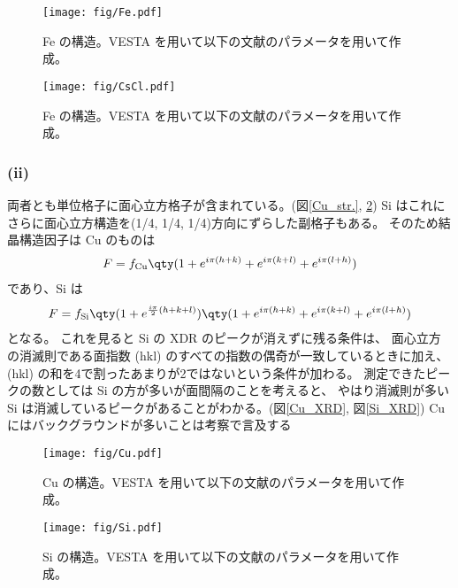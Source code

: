 \documentclass[11pt,dvipdfmx,a4paper]{jsarticle}
\begin{document}
\begin{figure}[h]
	\centering
	\begin{minipage}[t]{0.48\columnwidth}
		\centering
		\texttt{[image: fig/Fe.pdf]}
		\caption{Fe の構造。VESTA を用いて以下の文献のパラメータを用いて作成。\cite{cfi_Fe}}
		\label{Fe_str.}
	\end{minipage}
	\hfill
	\begin{minipage}[t]{0.48\columnwidth}
		\centering
		\texttt{[image: fig/CsCl.pdf]}
		\caption{Fe の構造。VESTA を用いて以下の文献のパラメータを用いて作成。\cite{cfi_CsCl}}
		\label{CsCl_str.}
	\end{minipage}
\end{figure}

\subsubsection*{(ii)}
両者とも単位格子に面心立方格子が含まれている。(図\ref{Cu_str.}, \ref{Si_str.})
Si はこれにさらに面心立方構造を(1/4, 1/4, 1/4)方向にずらした副格子もある。%
そのため結晶構造因子は Cu のものは
\begin{align}
	F = f_{\text{Cu}}\qty(1+e^{i\pi(h+k)}+e^{i\pi(k+l)}+e^{i\pi(l+h)})
\end{align}
であり、Si は
\begin{align}
	F = f_{\text{Si}}\qty(1+e^{\frac{i\pi}{2}(h+k+l)})\qty(1+e^{i\pi(h+k)}+e^{i\pi(k+l)}+e^{i\pi(l+h)})
\end{align}
となる。
これを見ると Si の XDR のピークが消えずに残る条件は、
面心立方の消滅則である面指数 (hkl) のすべての指数の偶奇が一致しているときに加え、
(hkl) の和を4で割ったあまりが2ではないという条件が加わる。
測定できたピークの数としては Si の方が多いが面間隔のことを考えると、
やはり消滅則が多い Si は消滅しているピークがあることがわかる。(図\ref{Cu_XRD}, 図\ref{Si_XRD})%
Cu にはバックグラウンドが多いことは考察で言及する\\ %
\begin{figure}[h]
	\centering
	\begin{minipage}[t]{0.48\columnwidth}
		\centering
		\texttt{[image: fig/Cu.pdf]}
		\caption{Cu の構造。VESTA を用いて以下の文献のパラメータを用いて作成。\cite{cfi_Cu}}
		\label{Cu_str.}
	\end{minipage}
	\hfill
	\begin{minipage}[t]{0.48\columnwidth}
		\centering
		\texttt{[image: fig/Si.pdf]}
		\caption{Si の構造。VESTA を用いて以下の文献のパラメータを用いて作成。\cite{cfi_Si}}
		\label{Si_str.}
	\end{minipage}
\end{figure}
\end{document}
